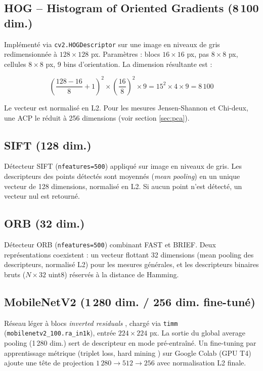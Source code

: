 \documentclass[12pt,a4paper]{report}
\begin{document}
\subsection*{HOG -- Histogram of Oriented Gradients (8\,100 dim.)}

Implémenté via \texttt{cv2.HOGDescriptor} sur une image en niveaux de gris redimensionnée à $128 \times 128$ px. Paramètres : blocs $16 \times 16$ px, pas $8 \times 8$ px, cellules $8 \times 8$ px, 9 bins d'orientation. La dimension résultante est :

\[
  \left(\frac{128-16}{8}+1\right)^2 \times \left(\frac{16}{8}\right)^2 \times 9
  = 15^2 \times 4 \times 9 = 8\,100
\]

Le vecteur est normalisé en L2. Pour les mesures Jensen-Shannon et Chi-deux, une ACP le réduit à 256 dimensions (voir section \ref{sec:pca}).

\subsection*{SIFT (128 dim.)}

Détecteur SIFT (\texttt{nfeatures=500}) appliqué sur image en niveaux de gris. Les descripteurs des points détectés sont moyennés (\emph{mean pooling}) en un unique vecteur de 128 dimensions, normalisé en L2. Si aucun point n'est détecté, un vecteur nul est retourné.

\subsection*{ORB (32 dim.)}

Détecteur ORB (\texttt{nfeatures=500}) combinant FAST et BRIEF. Deux représentations coexistent : un vecteur flottant 32 dimensions (mean pooling des descripteurs, normalisé L2) pour les mesures générales, et les descripteurs binaires bruts ($N \times 32$ uint8) réservés à la distance de Hamming.

\subsection*{MobileNetV2 (1\,280 dim. / 256 dim. fine-tuné)}

Réseau léger à blocs \emph{inverted residuals} \cite{sandler2018}, chargé via \texttt{timm} (\texttt{mobilenetv2\_100.ra\_in1k}), entrée $224 \times 224$ px. La sortie du global average pooling (1\,280 dim.) sert de descripteur en mode pré-entraîné. Un fine-tuning par apprentissage métrique (triplet loss, hard mining \cite{hermans2017}) sur Google Colab (GPU T4) ajoute une tête de projection $1\,280 \to 512 \to 256$ avec normalisation L2 finale.
\end{document}
